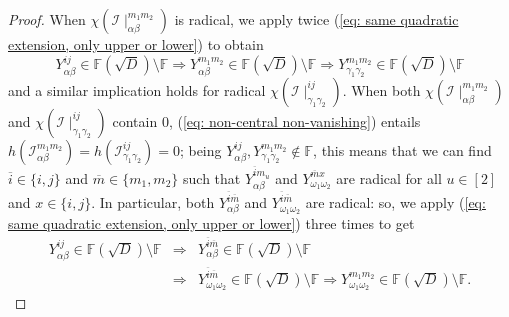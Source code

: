 \documentclass[10pt,a4paper]{amsart}
\begin{document}
\begin{proof}
When $\chi(\mathcal{I}\mid_{\alpha\beta}^{m_{1}m_{2}})$ is radical, we apply twice (\ref{eq: same quadratic extension, only upper or lower}) to obtain 
\begin{equation} 
Y_{\alpha\beta}^{ij}\in\mathbb{F}(\sqrt{D})\setminus \mathbb{F} \Rightarrow Y_{\alpha\beta}^{m_{1}m_{2}}\in\mathbb{F}(\sqrt{D})\setminus\mathbb{F} \Rightarrow Y_{\gamma_{1}\gamma_{2}}^{m_{1}m_{2}}\in\mathbb{F}(\sqrt{D})\setminus\mathbb{F}
\end{equation} 
and a similar implication holds for radical $\chi(\mathcal{I}\mid_{\gamma_{1}\gamma_{2}}^{ij})$. When both $\chi(\mathcal{I}\mid_{\alpha\beta}^{m_{1}m_{2}})$ and $\chi(\mathcal{I}\mid_{\gamma_{1}\gamma_{2}}^{ij})$ contain $0$, (\ref{eq: non-central non-vanishing}) entails $h(\mathcal{I}_{\alpha\beta}^{m_{1}m_{2}})=h(\mathcal{I}_{\gamma_{1}\gamma_{2}}^{ij})=0$; being $Y_{\alpha\beta}^{ij},Y_{\gamma_{1}\gamma_{2}}^{m_{1}m_{2}}\notin\mathbb{F}$, this means that we can find $\overline{i}\in\{i,j\}$ and $\overline{m}\in\{m_{1},m_{2}\}$ such that $Y_{\alpha\beta}^{\overline{i}m_{u}}$ and $Y_{\omega_{1}\omega_{2}}^{\overline{m}x}$ are radical for all $u\in[2]$ and $x\in\{i,j\}$. In particular, both $Y_{\alpha\beta}^{\overline{i}\overline{m}}$ and $Y_{\omega_{1}\omega_{2}}^{\overline{i}\overline{m}}$ are radical: so, we apply (\ref{eq: same quadratic extension, only upper or lower}) three times to get 
\begin{eqnarray}
    Y_{\alpha\beta}^{ij}\in\mathbb{F}(\sqrt{D})\setminus \mathbb{F} & \Rightarrow & 
    Y_{\alpha\beta}^{\overline{i}\overline{m}}\in\mathbb{F}(\sqrt{D})\setminus\mathbb{F} \nonumber \\ 
    & \Rightarrow &  Y_{\omega_{1}\omega_{2}}^{\overline{i}\overline{m}}\in\mathbb{F}(\sqrt{D})\setminus\mathbb{F} \Rightarrow Y_{\omega_{1}\omega_{2}}^{m_{1}m_{2}}\in\mathbb{F}(\sqrt{D})\setminus\mathbb{F}.
\end{eqnarray}
\end{proof}
\end{document}
